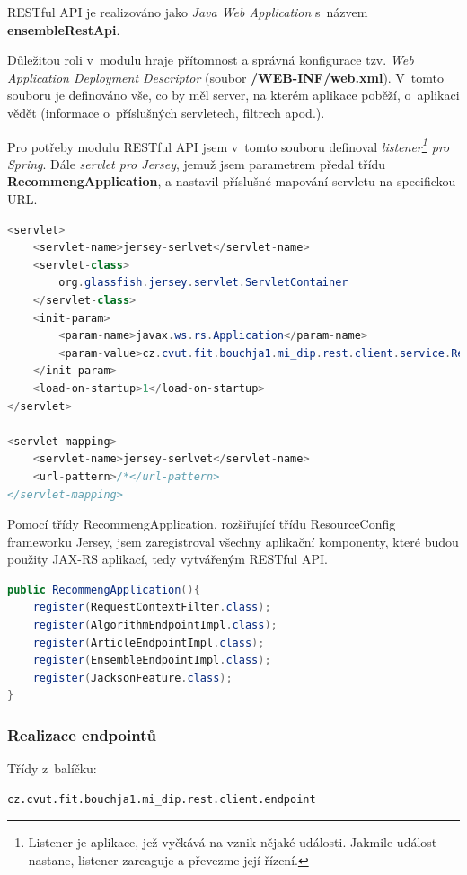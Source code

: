 \documentclass[thesis=M,czech]{FITthesis}[2014/05/07]
\begin{document}
RESTful API je realizováno jako \emph{Java Web Application} s~názvem \textbf{ensembleRestApi}.

Důležitou roli v~modulu hraje přítomnost a správná konfigurace tzv. \emph{Web Application Deployment Descriptor} (soubor \textbf{/WEB-INF/web.xml}). V~tomto souboru je definováno vše, co by měl server, na kterém aplikace poběží, o~aplikaci vědět (informace o~příslušných servletech, filtrech apod.).

Pro potřeby modulu RESTful API jsem v~tomto souboru definoval \emph{listener\footnote{Listener je aplikace, jež vyčkává na vznik nějaké události. Jakmile událost nastane, listener zareaguje a převezme její řízení.} pro Spring}. Dále \emph{servlet pro Jersey}, jemuž jsem parametrem předal třídu \textbf{RecommengApplication}, a nastavil příslušné mapování servletu na specifickou URL.

\begin{lstlisting}[language=java]
<servlet>
    <servlet-name>jersey-serlvet</servlet-name>
    <servlet-class>
        org.glassfish.jersey.servlet.ServletContainer
    </servlet-class>
    <init-param>
        <param-name>javax.ws.rs.Application</param-name>
        <param-value>cz.cvut.fit.bouchja1.mi_dip.rest.client.service.RecommengApplication</param-value>            
    </init-param>        
    <load-on-startup>1</load-on-startup>
</servlet>

<servlet-mapping>
    <servlet-name>jersey-serlvet</servlet-name>
    <url-pattern>/*</url-pattern>
</servlet-mapping>
\end{lstlisting}

Pomocí třídy RecommengApplication, rozšiřující třídu ResourceConfig frameworku Jersey, jsem zaregistroval všechny aplikační komponenty, které budou použity JAX-RS aplikací, tedy vytvářeným RESTful API.

\begin{lstlisting}[language=java]
public RecommengApplication(){
    register(RequestContextFilter.class);
    register(AlgorithmEndpointImpl.class);
    register(ArticleEndpointImpl.class);
    register(EnsembleEndpointImpl.class);
    register(JacksonFeature.class);        
}
\end{lstlisting}

\subsubsection{Realizace endpointů}
\label{sec:endpoints}
Třídy z~balíčku:

\begin{verbatim}
cz.cvut.fit.bouchja1.mi_dip.rest.client.endpoint
\end{verbatim}
\end{document}
